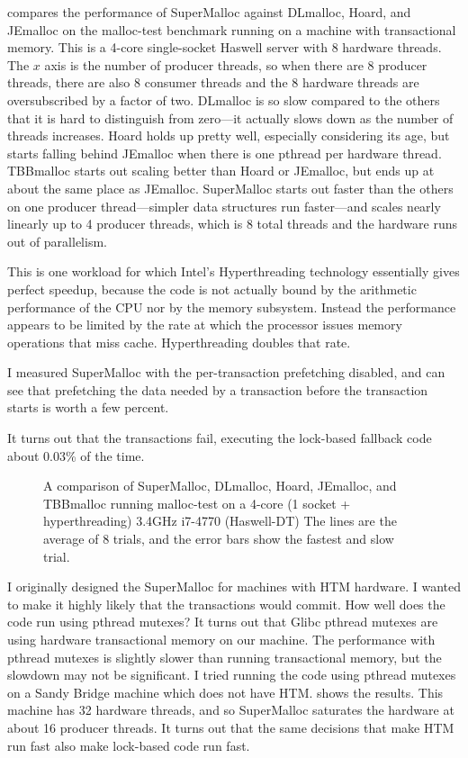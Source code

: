 \documentclass[natbib,sort&compress]{sigplanconf}
\begin{document}
 compares the performance of SuperMalloc against
DLmalloc, Hoard, and JEmalloc on the malloc-test benchmark running on
a machine with transactional memory.  This is a 4-core single-socket
Haswell server with 8 hardware threads.  The $x$ axis is the number of
producer threads, so when there are $8$ producer threads, there are
also $8$ consumer threads and the 8 hardware threads are
oversubscribed by a factor of two.  DLmalloc is so slow compared to
the others that it is hard to distinguish from zero---it actually
slows down as the number of threads increases.  Hoard holds up pretty
well, especially considering its age, but starts falling behind
JEmalloc when there is one pthread per hardware thread.  TBBmalloc
starts out scaling better than Hoard or JEmalloc, but ends up at about
the same place as JEmalloc.  SuperMalloc starts out faster than the
others on one producer thread---simpler data structures run
faster---and scales nearly linearly up to 4 producer threads, which is
8 total threads and the hardware runs out of parallelism.

This is one workload for which Intel's Hyperthreading technology
essentially gives perfect speedup, because the code is not actually
bound by the arithmetic performance of the CPU nor by the memory
subsystem.  Instead the performance appears to be limited by the rate
at which the processor issues memory operations that miss cache.
Hyperthreading doubles that rate.

I measured SuperMalloc with the per-transaction prefetching disabled,
and can see that prefetching the data needed by a transaction before
the transaction starts is worth a few percent.

It turns out that the transactions fail, executing the lock-based
fallback code about $0.03$\% of the time.

\begin{figure}

\caption{A comparison of SuperMalloc, DLmalloc, Hoard,
  JEmalloc, and TBBmalloc running malloc-test
  on a 4-core (1 socket + hyperthreading) 3.4GHz i7-4770 (Haswell-DT)
  The lines are the average of 8 trials, and the error bars
  show the fastest and slow trial.}
\label{fig:datahtm}
\vspace*{-3ex}
\end{figure}

I originally designed the SuperMalloc for machines with HTM hardware.
I wanted to make it highly likely that the transactions would commit.
How well does the code run using pthread mutexes?  It turns out that
Glibc pthread mutexes are using hardware transactional memory on our
machine.  The performance with pthread mutexes is slightly slower than
running transactional memory, but the slowdown may not be significant.
I tried running the code using pthread mutexes on a Sandy Bridge
machine which does not have HTM\@.   shows the
results. This machine has 32 hardware threads, and so SuperMalloc
saturates the hardware at about 16 producer threads.  It turns out
that the same decisions that make HTM run fast also make lock-based
code run fast.
\end{document}
